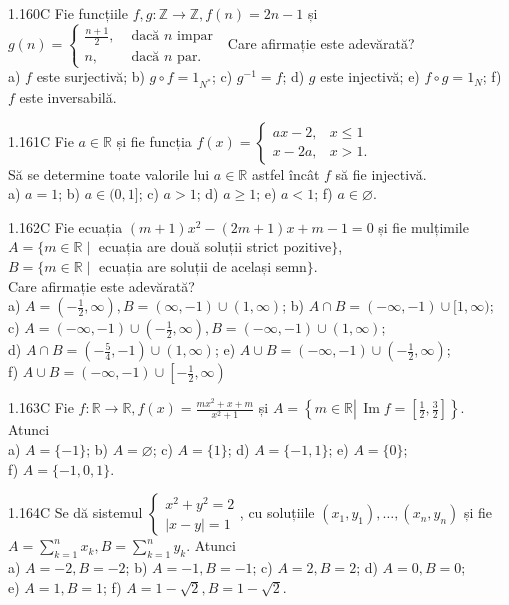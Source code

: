 \documentclass[11pt]{article}
\begin{document}
1.160C Fie funcțiile $f, g: \mathbb{Z} \rightarrow \mathbb{Z}, f(n)=2 n-1$ și $g(n)=\left\{\begin{array}{cl}\frac{n+1}{2}, & \text { dacă } n \text { impar } \\ n, & \text { dacă } n \text { par. }\end{array}\right.$ Care afirmație este adevărată?\\ a) $f$ este surjectivă; b) $g \circ f=1_{N^{*}}$; c) $g^{-1}=f$; d) $g$ este injectivă; e) $f \circ g=1_{N}$; f) $f$ este inversabilă.

1.161C Fie $a \in \mathbb{R}$ și fie funcția $f(x)= \begin{cases}a x-2, & x \leqslant 1 \\ x-2 a, & x>1.\end{cases}$\\ Să se determine toate valorile lui $a \in \mathbb{R}$ astfel încât $f$ să fie injectivă.\\ a) $a=1$; b) $a \in(0,1]$; c) $a>1$; d) $a \geq 1$; e) $a<1$; f) $a \in \varnothing$.

1.162C Fie ecuația $(m+1) x^{2}-(2 m+1) x+m-1=0$ și fie mulțimile\\$A=\{m \in \mathbb{R} \mid$ ecuația are două soluții strict pozitive$\}$,\\$B=\{m \in \mathbb{R} \mid$ ecuația are soluții de același semn$\}$.\\Care afirmație este adevărată?\\ a) $A=\left(-\frac{1}{2}, \infty\right), B=(\infty,-1) \cup(1, \infty)$; b) $A \cap B=(-\infty,-1) \cup[1, \infty)$;\\ c) $A=(-\infty,-1) \cup\left(-\frac{1}{2}, \infty\right), B=(-\infty,-1) \cup(1, \infty)$;\\ d) $A \cap B=\left(-\frac{5}{4},-1\right) \cup(1, \infty)$; e) $A \cup B=(-\infty,-1) \cup\left(-\frac{1}{2}, \infty\right)$;\\ f) $A \cup B=(-\infty,-1) \cup\left[-\frac{1}{2}, \infty\right)$ 

1.163C Fie $f: \mathbb{R} \rightarrow \mathbb{R}, f(x)=\frac{m x^{2}+x+m}{x^{2}+1}$ și $A=\left\{m \in \mathbb{R} \left\lvert\, \operatorname{Im} f=\left[\frac{1}{2}, \frac{3}{2}\right]\right.\right\}$.\\Atunci\\ a) $A=\{-1\}$; b) $A=\varnothing$; c) $A=\{1\}$; d) $A=\{-1,1\}$; e) $A=\{0\}$;\\ f) $A=\{-1,0,1\}$.

1.164C Se dă sistemul $\left\{\begin{array}{l}x^{2}+y^{2}=2 \\ |x-y|=1\end{array}\right.$, cu soluțiile $\left(x_{1}, y_{1}\right), \ldots,\left(x_{n}, y_{n}\right)$ și fie $A=\sum_{k=1}^{n} x_{k}, B=\sum_{k=1}^{n} y_{k}$. Atunci\\ a) $A=-2, B=-2$; b) $A=-1, B=-1$; c) $A=2, B=2$; d) $A=0, B=0$;\\e) $A=1, B=1$; f) $A=1-\sqrt{2}, B=1-\sqrt{2}$.
\end{document}

